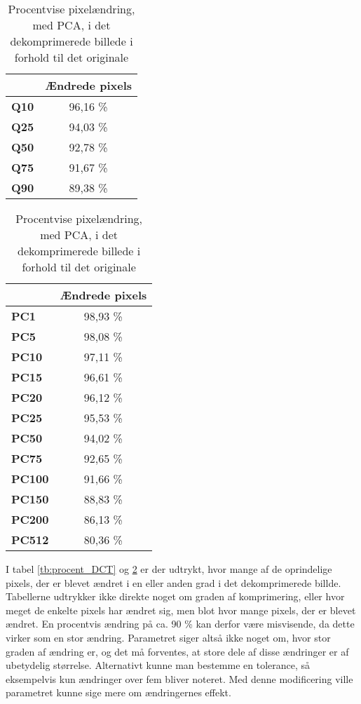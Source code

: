 \begin{table}[htbp]
\begin{minipage}[b]{0.45\linewidth}\centering
\begin{tabular}{|l|c|}
\hline
    & \textbf{Ændrede pixels} \\ \hline
\textbf{Q10} & 96,16     \%           \\ \hline
\textbf{Q25} & 94,03     \%           \\ \hline
\textbf{Q50} & 92,78     \%           \\ \hline
\textbf{Q75} & 91,67     \%           \\ \hline
\textbf{Q90} & 89,38     \%           \\ \hline
\end{tabular}
\caption{Procentvise pixelændring, med DCT, i det dekomprimerede billede i forhold til det originale}
\label{tb:procent_DCT}
\end{minipage}
\hspace{0.5cm}
\begin{minipage}[b]{0.45\linewidth}
\centering
\begin{tabular}{|l|c|}
\hline
      & \textbf{Ændrede pixels} \\ \hline
\textbf{PC1}   & 98,93   \%     \\ \hline
\textbf{PC5}   & 98,08   \%     \\ \hline
\textbf{PC10}  & 97,11   \%     \\ \hline
\textbf{PC15}  & 96,61   \%     \\ \hline
\textbf{PC20}  & 96,12   \%     \\ \hline
\textbf{PC25}  & 95,53   \%     \\ \hline
\textbf{PC50}  & 94,02   \%     \\ \hline
\textbf{PC75}  & 92,65   \%     \\ \hline
\textbf{PC100} & 91,66   \%     \\ \hline
\textbf{PC150} & 88,83   \%     \\ \hline
\textbf{PC200} & 86,13   \%     \\ \hline
\textbf{PC512} & 80,36   \%     \\ \hline
\end{tabular}
\caption{Procentvise pixelændring, med PCA, i det dekomprimerede billede i forhold til det originale}
\label{tb:procent_PCA}
\end{minipage}
\end{table}

I tabel \ref{tb:procent_DCT} og \ref{tb:procent_PCA} er der udtrykt, hvor mange af de oprindelige pixels, der er blevet ændret i en eller anden grad i det dekomprimerede billde. Tabellerne udtrykker ikke direkte noget om graden af komprimering, eller hvor meget de enkelte pixels har ændret sig, men blot hvor mange pixels, der er blevet ændret. En procentvis ændring på ca. 90 \% kan derfor være misvisende, da dette virker som en stor ændring. Parametret siger altså ikke noget om, hvor stor graden af ændring er, og det må forventes, at store dele af disse ændringer er af ubetydelig størrelse. Alternativt kunne man bestemme en tolerance, så eksempelvis kun ændringer over fem bliver noteret. Med denne modificering ville parametret kunne sige mere om ændringernes effekt.

